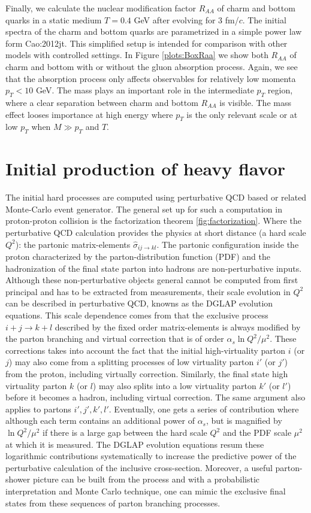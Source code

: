 Finally, we calculate the nuclear modification factor $R_{AA}$ of charm and bottom quarks in a static medium $T=0.4$ GeV after evolving for $3$ fm/$c$.
The initial spectra of the charm and bottom quarks are parametrized in a simple power law form {Cao:2012jt}.
This simplified setup is intended for comparison with other models with controlled settings.
In Figure \ref{plots:BoxRaa} we show both $R_{AA}$ of charm and bottom with or without the gluon absorption process. 
Again, we see that the absorption process only affects observables for relatively low momenta $p_T < 10$ GeV.
The mass plays an important role in the intermediate $p_T$ region, where a clear separation between charm and bottom $R_{AA}$ is visible.
The mass effect looses importance at high energy where $p_T$ is the only relevant scale or at low $p_T$ when $M \gg p_T$ and $T$. 

\section{Initial production of heavy flavor}
The initial hard processes are computed using perturbative QCD based or related Monte-Carlo event generator.
The general set up for such a computation in proton-proton collision is the factorization theorem \ref{fig:factorization}.
Where the perturbative QCD calculation provides the physics at short distance (a hard scale $Q^2$): the partonic matrix-elements $\hat{\sigma}_{ij\rightarrow kl}$.
The partonic configuration inside the proton characterized by the parton-distribution function (PDF) and the hadronization of the final state parton into hadrons are non-perturbative inputs.
Although these non-perturbative objects general cannot be computed from first principal and has to be extracted from measurements, their scale evolution in $Q^2$ can be described in perturbative QCD, knowns as the DGLAP evolution equations.
This scale dependence comes from that the exclusive process  $i+j \rightarrow k+l$ described by the fixed order matrix-elements is always modified by the parton branching and virtual correction that is of order $\alpha_s \ln Q^2/\mu^2$.
These corrections takes into account the fact that the initial high-virtuality parton $i$ (or $j$) may also come from a splitting processes of low virtuality parton $i'$ (or $j'$) from the proton, including virtually correction. 
Similarly, the final state high virtuality parton $k$ (or $l$) may also splits into a low virtuality parton $k'$ (or $l'$) before it becomes a hadron, including virtual correction.
The same argument also applies to partons $i', j', k', l'$. 
Eventually, one gets a series of contribution where although each term contains an additional power of $\alpha_s$, but is magnified by $\ln Q^2/\mu^2$ if there is a large gap between the hard scale $Q^2$ and the PDF scale $\mu^2$ at which it is measured.
The DGLAP evolution equations resum these logarithmic contributions systematically to increase the predictive power of the perturbative calculation of the inclusive cross-section.
Moreover, a useful parton-shower picture can be built from the process and with a probabilistic interpretation and Monte Carlo technique, one can mimic the exclusive final states from these sequences of parton branching processes.

